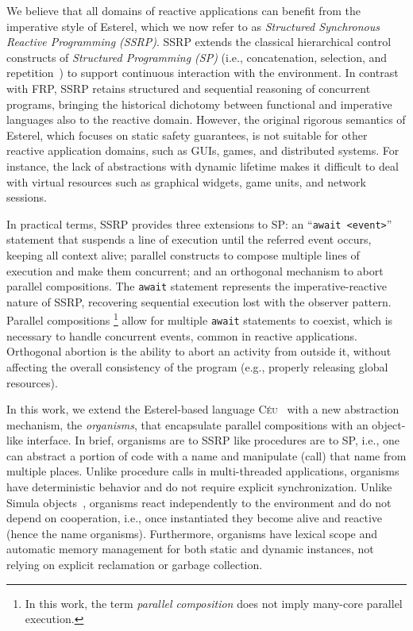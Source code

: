 \documentclass{sigplanconf}
\newcommand{\CEU}{\textsc{C\'{e}u}\xspace}
\newcommand{\code}[1] {{\small{\texttt{#1}}}}
\newcommand{\1}{\;}
\newcommand{\2}{\;\;}
\newcommand{\3}{\;\;\;}
\newcommand{\5}{\;\;\;\;\;}
\begin{document}
We believe that all domains of reactive applications can benefit from the 
imperative style of Esterel, which we now refer to as \emph{Structured 
Synchronous Reactive Programming (SSRP)}.
%
SSRP extends the classical hierarchical control constructs of \emph{Structured 
Programming (SP)} (i.e., concatenation, selection, and 
repetition~\cite{dij.notes}) to support continuous interaction with the 
environment.
%
In contrast with FRP, SSRP retains structured and sequential reasoning of 
concurrent programs, bringing the historical dichotomy between functional and 
imperative languages also to the reactive domain.
%
However, the original rigorous semantics of Esterel, which focuses on static 
safety guarantees, is not suitable for other reactive application domains, such 
as GUIs, games, and distributed systems.
%
For instance, the lack of abstractions with dynamic lifetime makes it difficult 
to deal with virtual resources such as graphical widgets, game units, and 
network sessions.

In practical terms, SSRP provides three extensions to SP:
an ``\code{await <event>}'' statement that suspends a line of execution until 
the referred event occurs, keeping all context alive;
parallel constructs to compose multiple lines of execution and make them 
concurrent;
and an orthogonal mechanism to abort parallel compositions.
%
The \code{await} statement represents the imperative-reactive nature of SSRP, 
recovering sequential execution lost with the observer pattern.
%
Parallel compositions%
\footnote{
In this work, the term \emph{parallel composition} does not imply many-core 
parallel execution.
}
allow for multiple \code{await} statements to coexist, which is necessary to 
handle concurrent events, common in reactive applications.
%
Orthogonal abortion is the ability to abort an activity from outside it, 
without affecting the overall consistency of the program (e.g., properly 
releasing global resources).

In this work, we extend the Esterel-based language \CEU~\cite{ceu.sensys13} 
with a new abstraction mechanism, the \emph{organisms}, that encapsulate 
parallel compositions with an object-like interface.
%
In brief, organisms are to SSRP like procedures are to SP, i.e., one can 
abstract a portion of code with a name and manipulate (call) that name from 
multiple places.
%
Unlike procedure calls in multi-threaded applications, organisms have 
deterministic behavior and do not require explicit synchronization.
%
Unlike Simula objects~\cite{simula}, organisms react independently to the 
environment and do not depend on cooperation, i.e., once instantiated they 
become alive and reactive (hence the name organisms).
%
Furthermore, organisms have lexical scope and automatic memory management for 
both static and dynamic instances, not relying on explicit reclamation or 
garbage collection.
%
%
\end{document}
